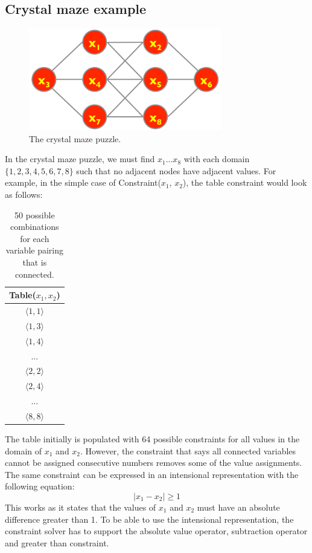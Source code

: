 \documentclass[CS4402-Notes.tex]{subfiles}
\begin{document}
\subsection{Crystal maze example}
\begin{figure}[H]
\centering
\includegraphics[width=0.75\textwidth, keepaspectratio]{imgs/crystal-maze.png}
\caption{The crystal maze puzzle.}
\end{figure}
\noindent
In the crystal maze puzzle, we must find $x_{1} ... x_{8}$ with each domain $\{1,2,3,4,5,6,7,8\}$ such that no adjacent nodes have adjacent values. For example, in the simple case of Constraint($x_{1}$, $x_{2}$), the table constraint would look as follows:
\begin{table}[H]
\centering
\begin{tabular}{| c |}
\hline
\textbf{Table($x_{1}, x_{2}$)} \\
\hline
$\langle 1, 1 \rangle$ \\
\hline
$\langle 1, 3 \rangle$ \\
\hline
$\langle 1, 4 \rangle$ \\
\hline
$...$ \\
\hline
$\langle 2, 2 \rangle$ \\
\hline
$\langle 2, 4 \rangle$ \\
\hline
$...$ \\
\hline
$\langle 8, 8 \rangle$ \\
\hline
\end{tabular}
\caption{50 possible combinations for each variable pairing that is connected.}
\end{table}
The table initially is populated with 64 possible constraints for all values in the domain of $x_{1}$ and $x_{2}$. However, the constraint that says all connected variables cannot be assigned consecutive numbers removes some of the value assignments. The same constraint can be expressed in an intensional representation with the following equation:
\begin{equation}
| x_{1} - x_{2} | \geq 1
\end{equation}
This works as it states that the values of $x_{1}$ and $x_{2}$ must have an absolute difference greater than 1. To be able to use the intensional representation, the constraint solver has to support the absolute value operator, subtraction operator and greater than constraint. 
\end{document}
